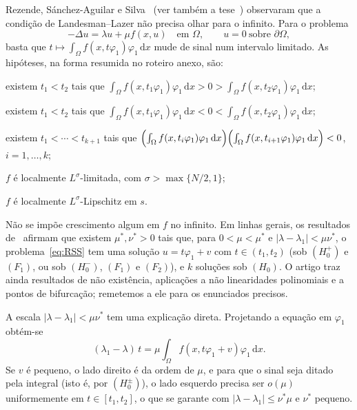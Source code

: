 \documentclass[11pt,a4paper]{article}
\theoremstyle{plain}
\theoremstyle{definition}
\theoremstyle{remark}
\newcommand{\abs}[1]{\lvert #1\rvert}
\newcommand{\dx}{\,\mathrm{d}x}
\begin{document}
Rezende, Sánchez-Aguilar e Silva~\cite{RezendeSanchezSilva2019} (ver também a
tese~\cite{SanchezAguilar2017}) observaram que a condição de Landesman--Lazer não
precisa olhar para o infinito. Para o problema
\begin{equation}\label{eq:RSS}
-\Delta u=\lambda u+\mu f(x,u)\quad\text{em }\Omega,\qquad u=0\ \text{sobre }\partial\Omega,
\end{equation}
basta que $t\mapsto\int_\Omega f(x,t\varphi_1)\varphi_1\dx$ mude de sinal num
intervalo limitado. As hipóteses, na forma resumida no roteiro anexo, são:
\begin{description}[leftmargin=2.6em,style=nextline]
\item[$(H_0^+)$] existem $t_1<t_2$ tais que
$\int_\Omega f(x,t_1\varphi_1)\varphi_1\dx>0>\int_\Omega f(x,t_2\varphi_1)\varphi_1\dx$;
\item[$(H_0^-)$] existem $t_1<t_2$ tais que
$\int_\Omega f(x,t_1\varphi_1)\varphi_1\dx<0<\int_\Omega f(x,t_2\varphi_1)\varphi_1\dx$;
\item[$(H_0)$] existem $t_1<\cdots<t_{k+1}$ tais que
$\Bigl(\int_\Omega f(x,t_i\varphi_1)\varphi_1\dx\Bigr)\Bigl(\int_\Omega f(x,t_{i+1}\varphi_1)\varphi_1\dx\Bigr)<0$,
$i=1,\dots,k$;
\item[$(F_1)$] $f$ é localmente $L^\sigma$-limitada, com $\sigma>\max\{N/2,1\}$;
\item[$(F_2)$] $f$ é localmente $L^\sigma$-Lipschitz em $s$.
\end{description}
Não se impõe crescimento algum em $f$ no infinito. Em linhas gerais, os
resultados de~\cite{RezendeSanchezSilva2019} afirmam que existem $\mu^*,\nu^*>0$
tais que, para $0<\mu<\mu^*$ e $\abs{\lambda-\lambda_1}<\mu\nu^*$, o
problema~\eqref{eq:RSS} tem uma solução $u=t\varphi_1+v$ com $t\in(t_1,t_2)$
(sob $(H_0^+)$ e $(F_1)$, ou sob $(H_0^-)$, $(F_1)$ e $(F_2)$), e $k$ soluções
sob $(H_0)$. O artigo traz ainda resultados de não existência, aplicações a não
linearidades polinomiais e a pontos de bifurcação; remetemos a ele para os
enunciados precisos.

A escala $\abs{\lambda-\lambda_1}<\mu\nu^*$ tem uma explicação direta. Projetando
a equação em $\varphi_1$ obtém-se
\[
(\lambda_1-\lambda)\,t=\mu\int_\Omega f(x,t\varphi_1+v)\varphi_1\dx .
\]
Se $v$ é pequeno, o lado direito é da ordem de $\mu$, e para que o sinal seja
ditado pela integral (isto é, por $(H_0^\pm)$), o lado esquerdo precisa ser
$o(\mu)$ uniformemente em $t\in[t_1,t_2]$, o que se garante com
$\abs{\lambda-\lambda_1}\le\nu^*\mu$ e $\nu^*$ pequeno.
\end{document}
